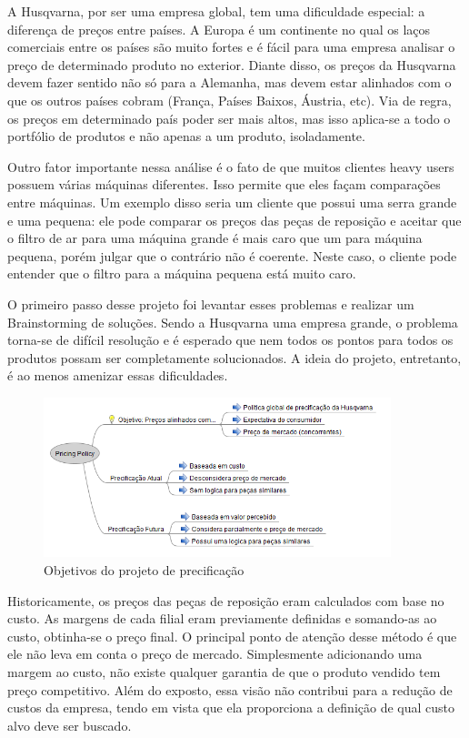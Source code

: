 \documentclass[12pt]{article}
\begin{document}
	A Husqvarna, por ser uma empresa global, tem uma dificuldade especial: a diferença de preços entre países. A Europa é um continente no qual os laços comerciais entre os países são muito fortes e é fácil para uma empresa analisar o preço de determinado produto no exterior. Diante disso, os preços da Husqvarna devem fazer sentido não só para a Alemanha, mas devem estar alinhados com o que os outros países cobram (França, Países Baixos, Áustria, etc). Via de regra, os preços em determinado país poder ser mais altos, mas isso aplica-se a todo o portfólio de produtos e não apenas a um produto, isoladamente.

	Outro fator importante nessa análise é o fato de que muitos clientes heavy users possuem várias máquinas diferentes. Isso permite que eles façam comparações entre máquinas. Um exemplo disso seria um cliente que possui uma serra grande e uma pequena: ele pode comparar os preços das peças de reposição e aceitar que o filtro de ar para uma máquina grande é mais caro que um para máquina pequena, porém julgar que o contrário não é coerente. Neste caso, o cliente pode entender que o filtro para a máquina pequena está muito caro.

	O primeiro passo desse projeto foi levantar esses problemas e realizar um Brainstorming de soluções. Sendo a Husqvarna uma empresa grande, o problema torna-se de difícil resolução e é esperado que nem todos os pontos para todos os produtos possam ser completamente solucionados. A ideia do projeto, entretanto, é ao menos amenizar essas dificuldades.

\begin{figure}[h!]
	\centering
	\includegraphics[width=0.9\textwidth]{img/pricing.png}
	\caption{Objetivos do projeto de precificação}
	\label{fig:pricing}
\end{figure}

	Historicamente, os preços das peças de reposição eram calculados com base no custo. As margens de cada filial eram previamente definidas e somando-as ao custo, obtinha-se o preço final. O principal ponto de atenção desse método é que ele não leva em conta o preço de mercado. Simplesmente adicionando uma margem ao custo, não existe qualquer garantia de que o produto vendido tem preço competitivo. Além do exposto, essa visão não contribui para a redução de custos da empresa, tendo em vista que ela proporciona a definição de qual custo alvo deve ser buscado.
\end{document}
